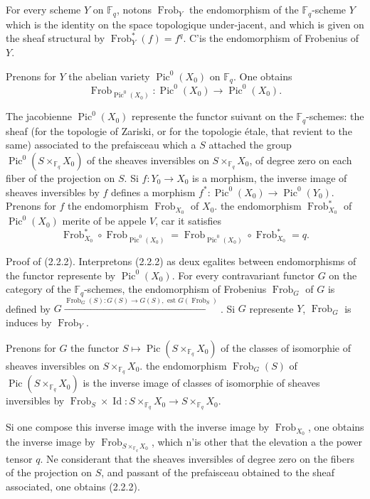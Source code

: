 \documentclass[11pt,a4paper]{article}
\theoremstyle{plain}
\theoremstyle{definition}
\DeclareMathOperator{\Pic}{Pic}
\DeclareMathOperator{\Frob}{Frob}
\DeclareMathOperator{\Id}{Id}
\newcommand{\F}{\mathbb{F}}
\begin{document}
\subsection{}
For every scheme $Y$ on $\F_q$, notons $\Frob_Y$ the endomorphism of the $\F_q$-scheme $Y$ which is the identity on the space topologique under-jacent, and which is given on the sheaf structural by $\Frob_Y^*(f) = f^q$. C'is the endomorphism of Frobenius of $Y$.

Prenons for $Y$ the abelian variety $\Pic^0(X_0)$ on $\F_q$. One obtains
\begin{equation}
\Frob_{\Pic^0(X_0)}: \Pic^0(X_0) \longrightarrow \Pic^0(X_0).
\tag{2.2.1}
\end{equation}

The jacobienne $\Pic^0(X_0)$ represente the functor suivant on the $\F_q$-schemes: the sheaf (for the topologie of Zariski, or for the topologie étale, that revient to the same) associated to the prefaisceau which a $S$ attached the group $\Pic^0(S \times_{\F_q} X_0)$ of the sheaves inversibles on $S \times_{\F_q} X_0$, of degree zero on each fiber of the projection on $S$. Si $f: Y_0 \to X_0$ is a morphism, the inverse image of sheaves inversibles by $f$ defines a morphism $f^*: \Pic^0(X_0) \to \Pic^0(Y_0)$. Prenons for $f$ the endomorphism $\Frob_{X_0}$ of $X_0$. the endomorphism $\Frob_{X_0}^*$ of $\Pic^0(X_0)$ merite of be appele $V$, car it satisfies
\begin{equation}
\Frob_{X_0}^* \circ \Frob_{\Pic^0(X_0)} = \Frob_{\Pic^0(X_0)} \circ \Frob_{X_0}^* = q.
\tag{2.2.2}
\end{equation}

Proof of (2.2.2). Interpretons (2.2.2) as deux egalites between endomorphisms of the functor represente by $\Pic^0(X_0)$. For every contravariant functor $G$ on the category of the $\F_q$-schemes, the endomorphism of Frobenius $\Frob_G$ of $G$ is defined by $G \xrightarrow{\Frob_G(S): G(S) \to G(S),\text{ est } G(\Frob_S)}$. Si $G$ represente $Y$, $\Frob_G$ is induces by $\Frob_Y$.

Prenons for $G$ the functor $S \mapsto \Pic(S \times_{\F_q} X_0)$ of the classes of isomorphie of sheaves inversibles on $S \times_{\F_q} X_0$. the endomorphism $\Frob_G(S)$ of $\Pic(S \times_{\F_q} X_0)$ is the inverse image of classes of isomorphie of sheaves inversibles by $\Frob_S \times \Id: S \times_{\F_q} X_0 \to S \times_{\F_q} X_0$.

Si one compose this inverse image with the inverse image by $\Frob_{X_0}$, one obtains the inverse image by $\Frob_{S \times_{\F_q} X_0}$, which n'is other that the elevation a the power tensor $q$. Ne considerant that the sheaves inversibles of degree zero on the fibers of the projection on $S$, and passant of the prefaisceau obtained to the sheaf associated, one obtains (2.2.2).
\end{document}
